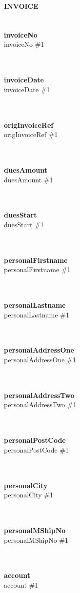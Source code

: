 \documentclass[12pt, paper = a4]{scrlttr2}
\newcommand{\nix}{}
\newcommand{\checkIfSet}[3]{%
  \ifcsname #1\endcsname%
    \ifx\#1\nix%
      #3%
    \else%
      #2%
    \fi%
  \else%
    #3%
  \fi%
}%
\begin{document}
\textbf{INVOICE} \\
\\
\\
\textbf{invoiceNo} \\
\checkIfSet{invoiceNo}{\invoiceNo} \\
\\
\textbf{invoiceDate} \\
\checkIfSet{invoiceDate}{\invoiceDate} \\
\\
\textbf{origInvoiceRef} \\
\checkIfSet{origInvoiceRef}{\origInvoiceRef} \\
\\
\textbf{duesAmount} \\
\checkIfSet{duesAmount}{\duesAmount} \\
\\
\textbf{duesStart} \\
\checkIfSet{duesStart}{\duesStart} \\
\\
\textbf{personalFirstname} \\
\checkIfSet{personalFirstname}{\personalFirstname} \\
\\
\textbf{personalLastname} \\
\checkIfSet{personalLastname}{\personalLastname} \\
\\
\textbf{personalAddressOne} \\
\checkIfSet{personalAddressOne}{\personalAddressOne} \\
\\
\textbf{personalAddressTwo} \\
\checkIfSet{personalAddressTwo}{\personalAddressTwo} \\
\\
\textbf{personalPostCode} \\
\checkIfSet{personalPostCode}{\personalPostCode} \\
\\
\textbf{personalCity} \\
\checkIfSet{personalCity}{\personalCity} \\
\\
\textbf{personalMShipNo} \\
\checkIfSet{personalMShipNo}{\personalMShipNo} \\
\\
\textbf{account} \\
\checkIfSet{account}{\account} \\
\\
\end{document}
